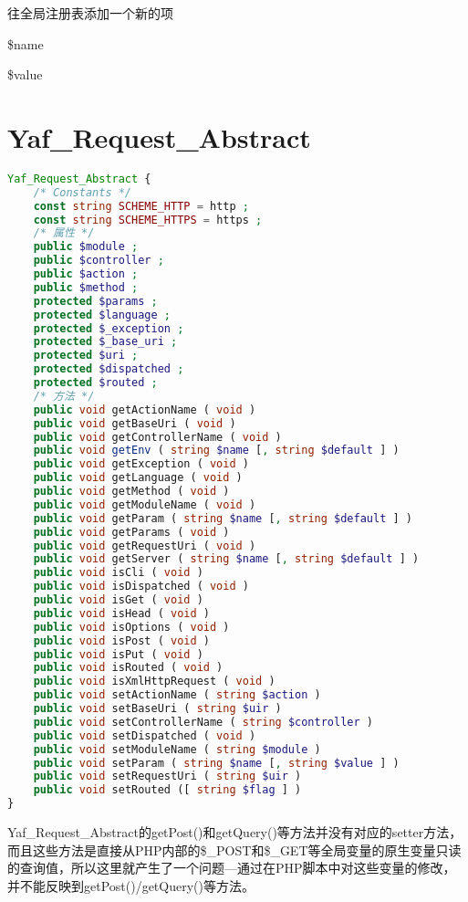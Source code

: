 往全局注册表添加一个新的项

\begin{compactitem}
\item \$name
\item \$value
\end{compactitem}

\chapter{Yaf\_Request\_Abstract}




\begin{lstlisting}[language=PHP]
Yaf_Request_Abstract {
    /* Constants */
    const string SCHEME_HTTP = http ;
    const string SCHEME_HTTPS = https ;
    /* 属性 */
    public $module ;
    public $controller ;
    public $action ;
    public $method ;
    protected $params ;
    protected $language ;
    protected $_exception ;
    protected $_base_uri ;
    protected $uri ;
    protected $dispatched ;
    protected $routed ;
    /* 方法 */
    public void getActionName ( void )
    public void getBaseUri ( void )
    public void getControllerName ( void )
    public void getEnv ( string $name [, string $default ] )
    public void getException ( void )
    public void getLanguage ( void )
    public void getMethod ( void )
    public void getModuleName ( void )
    public void getParam ( string $name [, string $default ] )
    public void getParams ( void )
    public void getRequestUri ( void )
    public void getServer ( string $name [, string $default ] )
    public void isCli ( void )
    public void isDispatched ( void )
    public void isGet ( void )
    public void isHead ( void )
    public void isOptions ( void )
    public void isPost ( void )
    public void isPut ( void )
    public void isRouted ( void )
    public void isXmlHttpRequest ( void )
    public void setActionName ( string $action )
    public void setBaseUri ( string $uir )
    public void setControllerName ( string $controller )
    public void setDispatched ( void )
    public void setModuleName ( string $module )
    public void setParam ( string $name [, string $value ] )
    public void setRequestUri ( string $uir )
    public void setRouted ([ string $flag ] )
}
\end{lstlisting}



Yaf\_Request\_Abstract的getPost()和getQuery()等方法并没有对应的setter方法，而且这些方法是直接从PHP内部的\$\_POST和\$\_GET等全局变量的原生变量只读的查询值，所以这里就产生了一个问题—通过在PHP脚本中对这些变量的修改，并不能反映到getPost()/getQuery()等方法。


